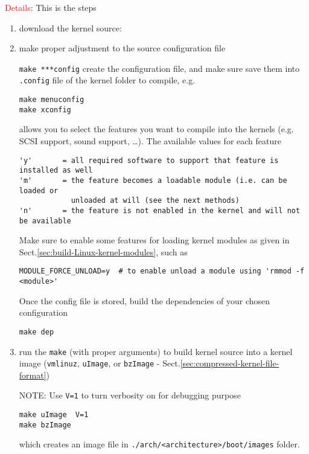 \textcolor{red}{Details}: This is the steps
\begin{enumerate}
  \item download the kernel source:

  \item make proper adjustment to the source configuration file

\verb!make ***config! create the configuration file, and make sure save them
into \verb!.config! file of the kernel folder to compile, e.g.
\begin{verbatim}
make menuconfig
make xconfig
\end{verbatim}
allows you to select the features you want to compile into the kernels (e.g. SCSI support,
sound support, \ldots). The available values for each feature
 \begin{verbatim}
'y'       = all required software to support that feature is installed as well
'm'       = the feature becomes a loadable module (i.e. can be loaded or
            unloaded at will (see the next methods)
'n'       = the feature is not enabled in the kernel and will not be available            
 \end{verbatim}

Make sure to enable some features for loading kernel modules as given in
Sect.\ref{sec:build-Linux-kernel-modules}, such as
\begin{verbatim}
MODULE_FORCE_UNLOAD=y  # to enable unload a module using 'rmmod -f <module>'
\end{verbatim}

  
Once the config file is stored, build the dependencies of your chosen configuration
\begin{verbatim}
make dep
\end{verbatim}
  
  \item run the \verb!make! (with proper arguments) to build kernel source
  into a kernel image (\verb!vmlinuz!, \verb!uImage!, or \verb!bzImage! -
  Sect.\ref{sec:compressed-kernel-file-format})

NOTE: Use \verb!V=1! to turn verbosity on for debugging purpose
\begin{verbatim}
make uImage  V=1
make bzImage  
\end{verbatim}
which creates an image file in \verb!./arch/<architecture>/boot/images! folder.



\end{enumerate}
